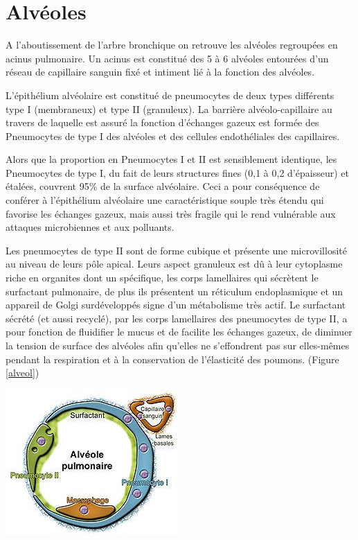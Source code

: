 		\section{Alvéoles}
A l’aboutissement de l’arbre bronchique on retrouve les alvéoles regroupées en acinus pulmonaire. Un acinus est constitué des 5 à 6 alvéoles entourées d’un réseau de capillaire sanguin fixé et intiment lié à la fonction des alvéoles.

L’épithélium alvéolaire est constitué de pneumocytes de deux types différents type I (membraneux) et type II (granuleux). La barrière alvéolo-capillaire au travers de laquelle est assuré la fonction d’échanges gazeux est formée des Pneumocytes de type I des alvéoles et des cellules endothéliales des capillaires. 

Alors que la proportion en Pneumocytes I et II est sensiblement identique, les Pneumocytes de type I, du fait de leurs structures fines (0,1 à {0,2}{\micro\metre} d'épaisseur) et étalées, couvrent 95\% de la surface alvéolaire. Ceci a pour conséquence de conférer à l’épithélium alvéolaire une caractéristique souple très étendu qui favorise les échanges gazeux, mais aussi très fragile qui le rend vulnérable aux attaques microbiennes et aux polluants.

Les pneumocytes de type II sont de forme cubique et présente une microvillosité au niveau de leurs pôle apical. Leurs aspect granuleux est dû à leur cytoplasme riche en organites dont un spécifique, les corps lamellaires qui sécrètent le surfactant pulmonaire, de plus ils présentent un réticulum endoplasmique et un appareil de Golgi surdéveloppés signe d’un métabolisme très actif. 
Le surfactant sécrété (et aussi recyclé), par les corps lamellaires des pneumocytes de type II, a pour fonction de fluidifier le mucus et de facilite les échanges gazeux, de diminuer la tension de surface des alvéoles afin qu'elles ne s'effondrent pas sur elles-mêmes pendant la respiration et à la conservation de l'élasticité des poumons. (Figure \ref{alveol})


\begin{center}
\includegraphics[scale=0.7]{gfx/alveole.jpg} 
\captionsetup{type=figure}
       \label{alveol}
\end{center}

